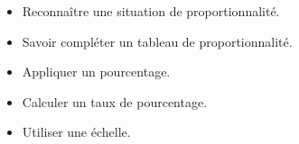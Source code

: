 \begin{myobj}
	\begin{itemize}
		\item Reconnaître une situation de proportionnalité.
		\item Savoir compléter un tableau de proportionnalité.
		\item Appliquer un pourcentage.
		\item Calculer un taux de pourcentage.
		\item Utiliser une échelle.
	\end{itemize}
\end{myobj}

%
%		



